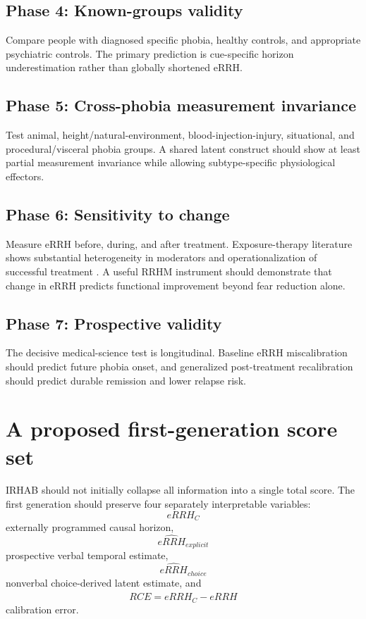 \documentclass[11pt]{article}
\begin{document}
\subsection{Phase 4: Known-groups validity}
Compare people with diagnosed specific phobia, healthy controls, and appropriate psychiatric controls. The primary prediction is cue-specific horizon underestimation rather than globally shortened eRRH.

\subsection{Phase 5: Cross-phobia measurement invariance}
Test animal, height/natural-environment, blood-injection-injury, situational, and procedural/visceral phobia groups. A shared latent construct should show at least partial measurement invariance while allowing subtype-specific physiological effectors.

\subsection{Phase 6: Sensitivity to change}
Measure eRRH before, during, and after treatment. Exposure-therapy literature shows substantial heterogeneity in moderators and operationalization of successful treatment \cite{bohnlein2020}. A useful RRHM instrument should demonstrate that change in eRRH predicts functional improvement beyond fear reduction alone.

\subsection{Phase 7: Prospective validity}
The decisive medical-science test is longitudinal. Baseline eRRH miscalibration should predict future phobia onset, and generalized post-treatment recalibration should predict durable remission and lower relapse risk.

\section{A proposed first-generation score set}
IRHAB should not initially collapse all information into a single total score. The first generation should preserve four separately interpretable variables:
\[
\boxed{eRRH_C}
\]
externally programmed causal horizon,
\[
\boxed{\widehat{eRRH}_{explicit}}
\]
prospective verbal temporal estimate,
\[
\boxed{\widehat{eRRH}_{choice}}
\]
nonverbal choice-derived latent estimate,
and
\[
\boxed{RCE=eRRH_C-\widehat{eRRH}}
\]
calibration error.
\end{document}
